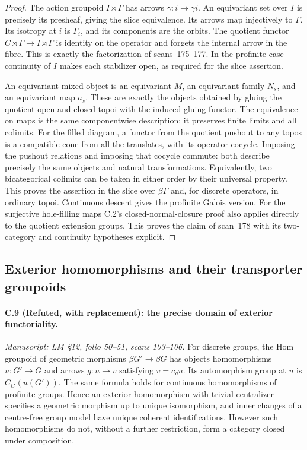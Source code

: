\begin{proof}
The action groupoid $I\rtimes\Gamma$ has
arrows $\gamma:i\to\gamma i$. An equivariant
set over $I$ is precisely its presheaf,
giving the slice equivalence. Its arrows
map injectively to $\Gamma$. Its isotropy
at $i$ is $\Gamma_i$, and its components
are the orbits. The quotient functor
$C\rtimes\Gamma\to I\rtimes\Gamma$
is identity on the operator and forgets
the internal arrow in the fibre.
This is exactly the factorization of
scans~175--177. In the profinite case
continuity of $I$ makes each stabilizer
open, as required for the slice assertion.

An equivariant mixed object is an
equivariant $M$, an equivariant family
$N_s$, and an equivariant map $a_s$.
These are exactly the objects obtained
by gluing the quotient open and closed
topoi with the induced gluing functor.
The equivalence on maps is the same
componentwise description; it preserves
finite limits and all colimits. For
the filled diagram, a functor from the
quotient pushout to any topos is a
compatible cone from all the translates,
with its operator cocycle. Imposing the
pushout relations and imposing that
cocycle commute: both describe precisely
the same objects and natural
transformations. Equivalently, two
bicategorical colimits can be taken
in either order by their universal
property. This proves the assertion
in the slice over $\beta\Gamma$ and,
for discrete operators, in ordinary
topoi. Continuous descent gives the
profinite Galois version. For the
surjective hole-filling maps C.2's
closed-normal-closure proof also
applies directly to the quotient
extension groups. This proves the
claim of scan~178 with its two-category
and continuity hypotheses explicit.
\end{proof}

\subsection{Exterior homomorphisms and their transporter groupoids}

\paragraph{C.9 (Refuted, with replacement): the precise domain of exterior functoriality.}\label{C9}
\textit{Manuscript: LM \S12, folio 50--51, scans 103--106.}
For discrete groups, the Hom groupoid of
geometric morphisms $\beta G'\to\beta G$
has objects homomorphisms $u:G'\to G$ and
arrows $g:u\to v$ satisfying $v=c_g u$.
Its automorphism group at $u$ is
$C_G(u(G'))$. The same formula holds
for continuous homomorphisms of profinite
groups. Hence an exterior homomorphism
with trivial centralizer specifies a
geometric morphism up to unique
isomorphism, and inner changes of a
centre-free group model have unique
coherent identifications. However such
homomorphisms do not, without a further
restriction, form a category closed
under composition.

